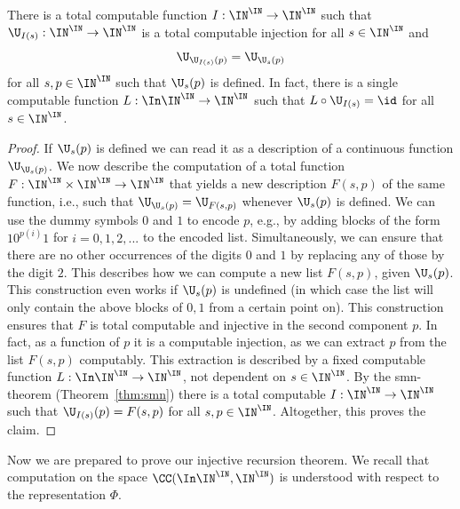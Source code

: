 \documentclass{lmcs}
\begin{document}
\begin{lem}[Injection]
\label{lem:injection}
There is a total computable function $I:\IN^\IN\to\IN^\IN$ such that
$\U_{I(s)}:\IN^\IN\to\IN^\IN$ is a total computable injection for all $s\in\IN^\IN$ and
\[\U_{\U_{I(s)}(p)}=\U_{\U_s(p)}\]
for all $s,p\in\IN^\IN$ such that $\U_s(p)$ is defined. In fact, there is a single computable
function $L:\In\IN^\IN\to\IN^\IN$ such that $L\circ\U_{I(s)}=\id$ for all $s\in\IN^\IN$.
\end{lem}
\begin{proof}
If $\U_s(p)$ is defined we can read it as a description of a continuous function $\U_{\U_s(p)}$.
We now describe the computation of a total function $F:\IN^\IN\times\IN^\IN\to\IN^\IN$ that
yields a new description $F(s,p)$ of the same function, i.e., such that $\U_{\U_s(p)}=\U_{F(s,p)}$
whenever $\U_s(p)$ is defined. 
We can use the dummy symbols
$0$ and $1$ to encode $p$, e.g., by adding blocks of the form $10^{p(i)}1$ for $i=0,1,2,...$ to the encoded list.
Simultaneously, we can ensure that there are no other occurrences of the digits $0$ and $1$ by replacing
any of those by the digit $2$.
This describes how we can compute a new list $F(s,p)$, given $\U_s(p)$. 
This construction even works if $\U_s(p)$ is undefined (in which case the list will only contain the above blocks of $0,1$ from
a certain point on). 
This construction ensures that
$F$ is total computable and injective in the second component $p$. In fact, as a function of $p$ 
it is a computable injection, as we can extract $p$ from the list $F(s,p)$ computably. 
This extraction is described by a fixed computable function $L:\In\IN^\IN\to\IN^\IN$, not dependent on $s\in\IN^\IN$.
By the smn-theorem (Theorem~\ref{thm:smn}) 
there is 
a total computable $I:\IN^\IN\to\IN^\IN$ such that $\U_{I(s)}(p)=F(s,p)$ for all $s,p\in\IN^\IN$.
Altogether, this proves the claim.
\end{proof}

\noindent
Now we are prepared to prove our injective recursion theorem. We recall that computation on the space
$\CC(\In\IN^\IN,\IN^\IN)$ is understood with respect to the representation $\Phi$.
\end{document}
